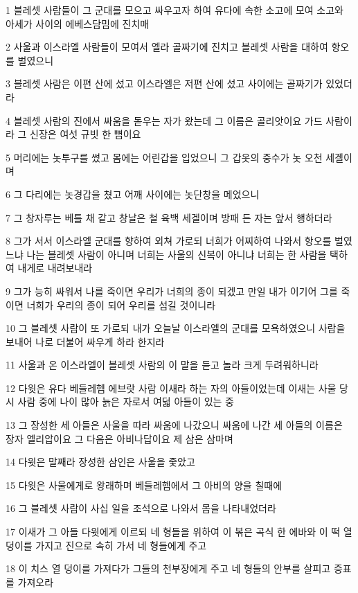 \par 1 블레셋 사람들이 그 군대를 모으고 싸우고자 하여 유다에 속한 소고에 모여 소고와 아세가 사이의 에베스담밈에 진치매
\par 2 사울과 이스라엘 사람들이 모여서 엘라 골짜기에 진치고 블레셋 사람을 대하여 항오를 벌였으니
\par 3 블레셋 사람은 이편 산에 섰고 이스라엘은 저편 산에 섰고 사이에는 골짜기가 있었더라
\par 4 블레셋 사람의 진에서 싸움을 돋우는 자가 왔는데 그 이름은 골리앗이요 가드 사람이라 그 신장은 여섯 규빗 한 뼘이요
\par 5 머리에는 놋투구를 썼고 몸에는 어린갑을 입었으니 그 갑옷의 중수가 놋 오천 세겔이며
\par 6 그 다리에는 놋경갑을 쳤고 어깨 사이에는 놋단창을 메었으니
\par 7 그 창자루는 베틀 채 같고 창날은 철 육백 세겔이며 방패 든 자는 앞서 행하더라
\par 8 그가 서서 이스라엘 군대를 향하여 외쳐 가로되 너희가 어찌하여 나와서 항오를 벌였느냐 나는 블레셋 사람이 아니며 너희는 사울의 신복이 아니냐 너희는 한 사람을 택하여 내게로 내려보내라
\par 9 그가 능히 싸워서 나를 죽이면 우리가 너희의 종이 되겠고 만일 내가 이기어 그를 죽이면 너희가 우리의 종이 되어 우리를 섬길 것이니라
\par 10 그 블레셋 사람이 또 가로되 내가 오늘날 이스라엘의 군대를 모욕하였으니 사람을 보내어 나로 더불어 싸우게 하라 한지라
\par 11 사울과 온 이스라엘이 블레셋 사람의 이 말을 듣고 놀라 크게 두려워하니라
\par 12 다윗은 유다 베들레헴 에브랏 사람 이새라 하는 자의 아들이었는데 이새는 사울 당시 사람 중에 나이 많아 늙은 자로서 여덟 아들이 있는 중
\par 13 그 장성한 세 아들은 사울을 따라 싸움에 나갔으니 싸움에 나간 세 아들의 이름은 장자 엘리압이요 그 다음은 아비나답이요 제 삼은 삼마며
\par 14 다윗은 말째라 장성한 삼인은 사울을 좇았고
\par 15 다윗은 사울에게로 왕래하며 베들레헴에서 그 아비의 양을 칠때에
\par 16 그 블레셋 사람이 사십 일을 조석으로 나와서 몸을 나타내었더라
\par 17 이새가 그 아들 다윗에게 이르되 네 형들을 위하여 이 볶은 곡식 한 에바와 이 떡 열 덩이를 가지고 진으로 속히 가서 네 형들에게 주고
\par 18 이 치스 열 덩이를 가져다가 그들의 천부장에게 주고 네 형들의 안부를 살피고 증표를 가져오라
